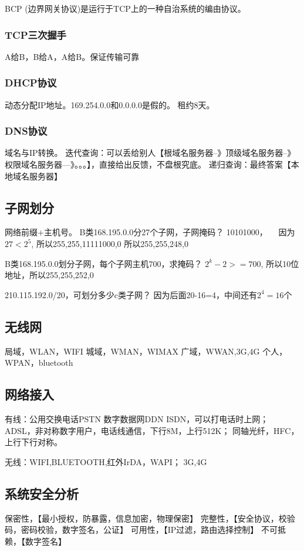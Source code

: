 \documentclass[UTF8]{article}
\begin{document}
BCP (边界网关协议)是运行于TCP上的一种自治系统的编由协议。






\subsubsection{TCP三次握手}
A给B，B给A，A给B。保证传输可靠

\subsubsection{DHCP协议}
动态分配IP地址。169.254.0.0和0.0.0.0是假的。
租约8天。
\subsubsection{DNS协议}
域名与IP转换。
迭代查询：可以丢给别人【根域名服务器--》顶级域名服务器--》权限域名服务器---》。。。】，直接给出反馈，不盘根究底。
递归查询：最终答案【本地域名服务器】


\subsection{子网划分}
网络前缀+主机号。
B类168.195.0.0分27个子网，子网掩码？
10101000，~~
因为$27<2^5$,
所以255,255,11111000,0
所以255,255,248,0

B类168.195.0.0划分子网，每个子网主机700，求掩码？
$2^k-2>=700$, 所以10位地址，所以255,255,252,0


210.115.192.0/20，可划分多少c类子网？
因为后面20-16=4，中间还有$2^4=16$个

\subsection{无线网}
局域，WLAN，WIFI
城域，WMAN，WIMAX
广域，WWAN,3G,4G
个人，WPAN，bluetooth

\subsection{网络接入}
有线：公用交换电话PSTN
数字数据网DDN 
ISDN，可以打电话时上网；
ADSL，非对称数字用户，电话线通信，下行8M，上行512K；
同轴光纤，HFC，上行下行对称。

无线：WIFI,BLUETOOTH,红外IrDA，WAPI；
3G,4G


\subsection{系统安全分析}
保密性，【最小授权，防暴露，信息加密，物理保密】
完整性，【安全协议，校验码，密码校验，数字签名，公证】
可用性，【IP过滤，路由选择控制】
不可抵赖，【数字签名】
\end{document}
